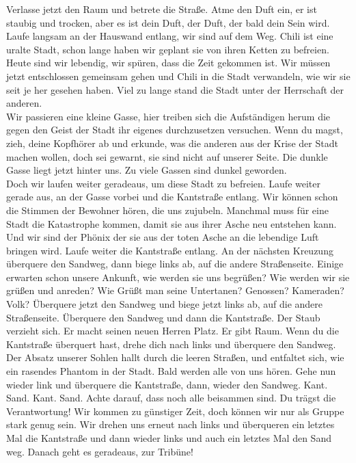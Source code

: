 \documentclass[a4paper, 12pt]{article}
\begin{document}
Verlasse jetzt den Raum und betrete die Straße. 
Atme den Duft ein, er ist staubig und trocken, aber es ist dein Duft, der Duft, der bald dein Sein wird.
Laufe langsam an der Hauswand entlang, wir sind auf dem Weg.
Chili ist eine uralte Stadt, schon lange haben wir geplant sie von ihren Ketten zu befreien. 
Heute sind wir lebendig, wir spüren, dass die Zeit gekommen ist.
Wir müssen jetzt entschlossen gemeinsam gehen und Chili in die Stadt verwandeln, wie wir sie seit je her gesehen haben.
Viel zu lange stand die Stadt unter der Herrschaft der anderen. \\

Wir passieren eine kleine Gasse, hier treiben sich die Aufständigen herum die gegen den Geist der Stadt ihr eigenes durchzusetzen versuchen.
Wenn du magst, zieh, deine Kopfhörer ab und erkunde, was die anderen aus der Krise der Stadt machen wollen, doch sei gewarnt, sie sind nicht auf unserer Seite.
Die dunkle Gasse liegt jetzt hinter uns. 
Zu viele Gassen sind dunkel geworden.\\

Doch wir laufen weiter geradeaus, um diese Stadt zu befreien.
Laufe weiter gerade aus, an der Gasse vorbei und die Kantstraße entlang. 
Wir können schon die Stimmen der Bewohner hören, die uns zujubeln. 
Manchmal muss für eine Stadt die Katastrophe kommen, damit sie aus ihrer Asche neu entstehen kann.
Und wir sind der Phönix der sie aus der toten Asche an die lebendige Luft bringen wird.
Laufe weiter die Kantstraße entlang.
An der nächsten Kreuzung überquere den Sandweg, dann biege links ab, auf die andere Straßenseite.
Einige erwarten schon unsere Ankunft, wie werden sie uns begrüßen?
Wie werden wir sie grüßen und anreden?
Wie Grüßt man seine Untertanen? Genossen? Kameraden? Volk? 
Überquere jetzt den Sandweg und biege jetzt links ab, auf die andere Straßenseite. 
Überquere den Sandweg und dann die Kantstraße.
Der Staub verzieht sich. 
Er macht seinen neuen Herren Platz. 
Er gibt Raum.
Wenn du die Kantstraße überquert hast, drehe dich nach links und überquere den Sandweg.
Der Absatz unserer Sohlen hallt durch die leeren Straßen, und entfaltet sich, wie ein rasendes Phantom in der Stadt.
Bald werden alle von uns hören.
Gehe nun wieder link und überquere die Kantstraße, dann, wieder den Sandweg.
Kant. Sand. Kant. Sand.
Achte darauf, dass noch alle beisammen sind. 
Du trägst die Verantwortung!
Wir kommen zu günstiger Zeit, doch können wir nur als Gruppe stark genug sein.
Wir drehen uns erneut nach links und überqueren ein letztes Mal die Kantstraße und dann wieder links und auch ein letztes Mal den Sand weg. 
Danach geht es geradeaus, zur Tribüne!\\
\end{document}

